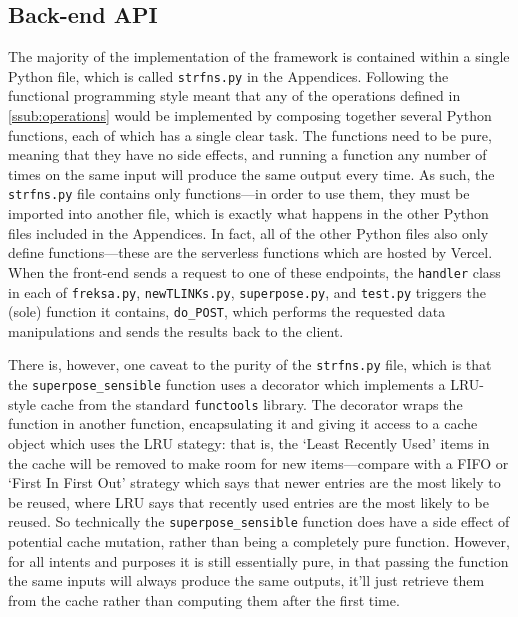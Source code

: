 \documentclass[a4paper,12pt,leqno]{article}
\begin{document}
\subsection{Back-end API}\label{sub:backend} %
The majority of the implementation of the framework is contained within a single Python file, which is called \verb|strfns.py| in the Appendices. Following the functional programming style meant that any of the operations defined in \cref{ssub:operations} would be implemented by composing together several Python functions, each of which has a single clear task. The functions need to be pure, meaning that they have no side effects, and running a function any number of times on the same input will produce the same output every time. As such, the \verb|strfns.py| file contains only functions---in order to use them, they must be imported into another file, which is exactly what happens in the other Python files included in the Appendices. In fact, all of the other Python files also only define functions---these are the serverless functions which are hosted by Vercel. When the front-end sends a request to one of these endpoints, the \verb|handler| class in each of \verb|freksa.py|, \verb|newTLINKs.py|, \verb|superpose.py|, and \verb|test.py| triggers the (sole) function it contains, \verb|do_POST|, which performs the requested data manipulations and sends the results back to the client.

There is, however, one caveat to the purity of the \verb|strfns.py| file, which is that the \verb|superpose_sensible| function uses a decorator which implements a LRU-style cache from the standard \verb|functools| library. The decorator wraps the function in another function, encapsulating it and giving it access to a cache object which uses the LRU stategy: that is, the `Least Recently Used' items in the cache will be removed to make room for new items---compare with a FIFO or `First In First Out' strategy which says that newer entries are the most likely to be reused, where LRU says that recently used entries are the most likely to be reused. So technically the \verb|superpose_sensible| function does have a side effect of potential cache mutation, rather than being a completely pure function. However, for all intents and purposes it is still essentially pure, in that passing the function the same inputs will always produce the same outputs, it'll just retrieve them from the cache rather than computing them after the first time.
\end{document}
